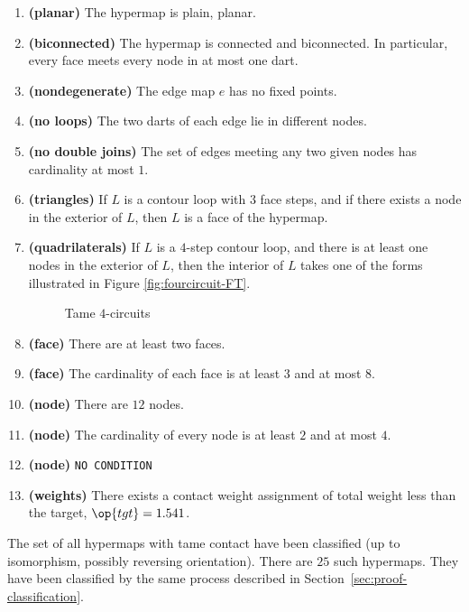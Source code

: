 \begin{enumerate}
    \label{definition:tame}
    \item {\bf (planar)} The hypermap is plain, planar.
    \item {\bf (biconnected)} The hypermap is connected and biconnected.  In particular, every face meets every node in at most one dart.
    \item {\bf (nondegenerate)} The edge map $e$ has no fixed points.
    \item {\bf (no loops)} The two darts of each edge lie in different nodes.
    \item {\bf (no double joins)} The set of edges meeting any two given nodes has cardinality at most $1$.
    \label{definition:tame:40}

    \item {\bf (triangles)} If $L$ is a contour loop with $3$ face steps, and if there exists a node in
    the exterior of $L$, then $L$ is a face of the hypermap.
    \label{definition:tame:3-circuit}

    \item {\bf (quadrilaterals)} If $L$ is a $4$-step contour loop, and there is at least one nodes
    in the exterior of $L$, then the interior of $L$ takes one of the forms
    illustrated in Figure
    \ref{fig:fourcircuit-FT}.
    \label{definition:tame:4-circuit-FT}
    \begin{figure}[htb]
        \centering
        \caption{Tame $4$-circuits}
        \label{fig:fourcircuit}
    \end{figure}
  \item {\bf (face)} There are at least two faces.
    \item {\bf (face)} The cardinality of each face is at least $3$ and at most $8$.
    \label{definition:tame:length}
    \item {\bf (node)} There are $12$ nodes.
    \item {\bf (node)} The cardinality of every node is at least $2$ and at most    $4$.
    \label{definition:tame:degree}
    \item {\bf (node)} {\tt NO CONDITION}
    \label{definition:tame:degreeE}
    \item {\bf (weights)} There exists a contact weight assignment
        of total weight less than the target, $\op{tgt}=1.541$.
    \label{definition:tame:squander}
\end{enumerate}
%

The set of all hypermaps with tame contact have been classified (up to isomorphism, possibly reversing orientation).  There are $25$ such hypermaps.  They have been classified by the same process described in Section~\ref{sec:proof-classification}.


